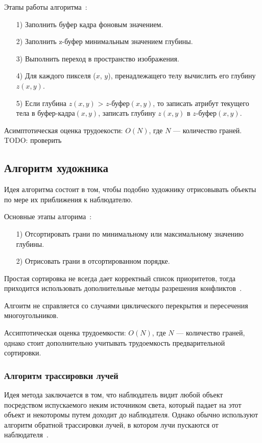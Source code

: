    Этапы работы алгоритма~\cite{rogers}:
   
   \begin{enumerate}
   	\item[1)] Заполнить буфер кадра фоновым значением.
   	\item[2)] Заполнить z-буфер минимальным значением глубины.
   	\item[3)] Выполнить переход в пространство изображения.
   	\item[4)] Для каждого пикселя ($x$, $y$), пренадлежащего телу вычислить его глубину $z(x, y)$.
   	\item[5)] Если глубина $z(x, y)$ > $z\textit{-буфер}(x, y)$, то записать атрибут текущего тела в $\textit{буфер-кадра}(x, y)$, записать глубину $z(x, y)$ в $z\textit{-буфер}(x, y)$.
   \end{enumerate}
   
   
   Асимптотическая оценка трудоекости: $O(N)$, где $N$ --- количество граней. TODO: проверить
      
   \subsection{Алгоритм художника}
   
   Идея алгоритма состоит в том, чтобы подобно художнику отрисовывать объекты по мере их приближения к наблюдателю.
   
   Основные этапы алгорима~\cite{rogers}:
   \begin{enumerate}
   	\item[1)] Отсортировать грани по минимальному или максимальному значению глубины.
   	\item[2)] Отрисовать грани в отсортированном порядке.
   \end{enumerate}
   
   Простая сортировка не всегда дает корректный список приоритетов, тогда приходится использовать дополнительные методы разрешения конфликтов~\cite{rogers}. 
   
   Алгоитм не справляется со случаями циклического перекрытия и пересечения многоугольников.
   
   Ассиптотическая оценка трудоемкости: $O(N)$, где $N$ --- количество граней, однако стоит дополнительно учитывать трудоемкость предварительной сортировки.
     
    \subsubsection{Алгоритм трассировки лучей}
     Идея метода заключается в том, что наблюдатель видит любой объект посредством испускаемого неким источником света, который падает на этот объект и некоторомы путем доходит до наблюдателя. Однако обычно используют алгоритм обратной трассировки лучей, в котором лучи пускаются от наблюдателя~\cite{rogers}.
     
